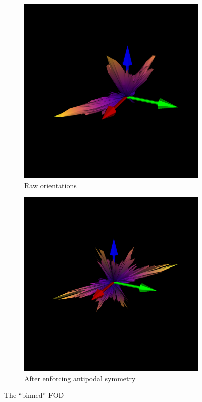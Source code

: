 \documentclass{article}
\begin{document}
\begin{figure}[h]
  \centering
  \begin{subfigure}[b]{0.48\textwidth}
    \centering
    \includegraphics[width=0.9\linewidth]{../odf_comparison/raw_odf}
    \caption{Raw orientations}
    \label{fig:fod_raw}
  \end{subfigure}
  \hspace{0.5em}
  \begin{subfigure}[b]{0.48\textwidth}
    \centering
    \includegraphics[width=0.9\linewidth]{../odf_comparison/raw_odf_even}
    \caption{After enforcing antipodal symmetry}
    \label{fig:fod_even}
  \end{subfigure}
  \caption{The ``binned'' \uct FOD}
\end{figure}
\end{document}
